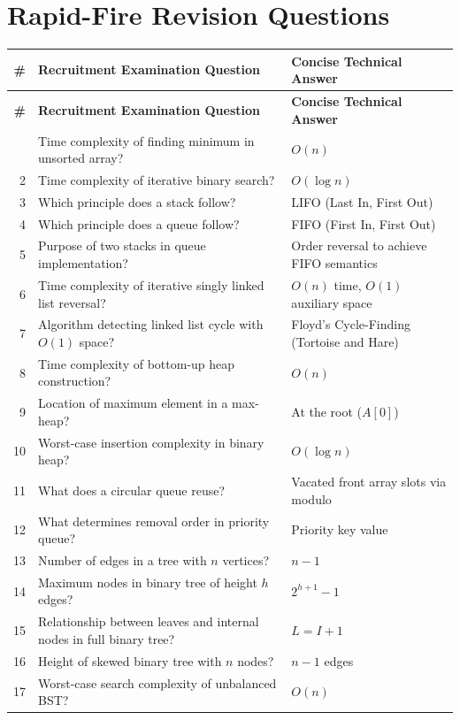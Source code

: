\section{Rapid-Fire Revision Questions}

\begin{longtable}{r p{9.2cm} p{6.0cm}}
\toprule
\textbf{\#} & \textbf{Recruitment Examination Question} & \textbf{Concise Technical Answer} \\
\midrule
\endfirsthead
\toprule
\textbf{\#} & \textbf{Recruitment Examination Question} & \textbf{Concise Technical Answer} \\
\midrule
\endhead
\bottomrule
\endfoot
\bottomrule
\endlastfoot
1  & Time complexity of finding minimum in unsorted array? & $O(n)$ \\
2  & Time complexity of iterative binary search? & $O(\log n)$ \\
3  & Which principle does a stack follow? & LIFO (Last In, First Out) \\
4  & Which principle does a queue follow? & FIFO (First In, First Out) \\
5  & Purpose of two stacks in queue implementation? & Order reversal to achieve FIFO semantics \\
6  & Time complexity of iterative singly linked list reversal? & $O(n)$ time, $O(1)$ auxiliary space \\
7  & Algorithm detecting linked list cycle with $O(1)$ space? & Floyd's Cycle-Finding (Tortoise and Hare) \\
8  & Time complexity of bottom-up heap construction? & $O(n)$ \\
9  & Location of maximum element in a max-heap? & At the root ($A[0]$) \\
10 & Worst-case insertion complexity in binary heap? & $O(\log n)$ \\
11 & What does a circular queue reuse? & Vacated front array slots via modulo \\
12 & What determines removal order in priority queue? & Priority key value \\
13 & Number of edges in a tree with $n$ vertices? & $n - 1$ \\
14 & Maximum nodes in binary tree of height $h$ edges? & $2^{h+1} - 1$ \\
15 & Relationship between leaves and internal nodes in full binary tree? & $L = I + 1$ \\
16 & Height of skewed binary tree with $n$ nodes? & $n - 1$ edges \\
17 & Worst-case search complexity of unbalanced BST? & $O(n)$ \\

\end{longtable}
